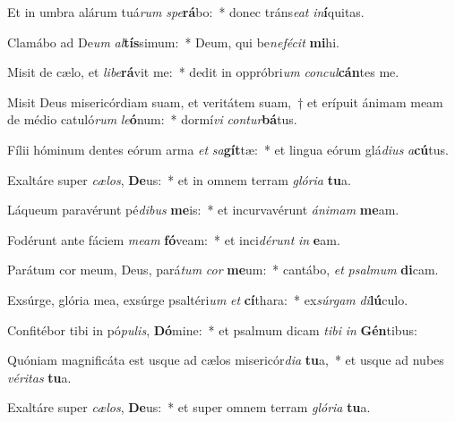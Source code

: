 \item Et in umbra alárum tuá\textit{rum} \textit{spe}\textbf{rá}bo:~* donec tráns\textit{e}\textit{at} \textit{in}\textbf{í}quitas.
\item Clamábo ad De\textit{um} \textit{al}\textbf{tís}simum:~* Deum, qui be\textit{ne}\textit{fé}\textit{cit} \textbf{mi}hi.
\item Misit de cælo, et \textit{li}\textit{be}\textbf{rá}vit me:~* dedit in oppróbri\textit{um} \textit{con}\textit{cul}\textbf{cán}tes me.
\item Misit Deus misericórdiam suam, et veritátem suam,~† et erípuit ánimam meam de médio catuló\textit{rum} \textit{le}\textbf{ó}num:~* dormí\textit{vi} \textit{con}\textit{tur}\textbf{bá}tus.
\item Fílii hóminum dentes eórum arma \textit{et} \textit{sa}\textbf{gít}tæ:~* et lingua eórum glá\textit{di}\textit{us} \textit{a}\textbf{cú}tus.
\item Exaltáre super \textit{cæ}\textit{los}, \textbf{De}us:~* et in omnem terram \textit{gló}\textit{ri}\textit{a} \textbf{tu}a.
\item Láqueum paravérunt pé\textit{di}\textit{bus} \textbf{me}is:~* et incurvavérunt \textit{á}\textit{ni}\textit{mam} \textbf{me}am.
\item Fodérunt ante fáciem \textit{me}\textit{am} \textbf{fó}veam:~* et inci\textit{dé}\textit{runt} \textit{in} \textbf{e}am.
\item Parátum cor meum, Deus, pará\textit{tum} \textit{cor} \textbf{me}um:~* cantábo, \textit{et} \textit{psal}\textit{mum} \textbf{di}cam.
\item Exsúrge, glória mea, exsúrge psaltéri\textit{um} \textit{et} \textbf{cí}thara:~* ex\textit{súr}\textit{gam} \textit{di}\textbf{lú}culo.
\item Confitébor tibi in pó\textit{pu}\textit{lis}, \textbf{Dó}mine:~* et psalmum dicam \textit{ti}\textit{bi} \textit{in} \textbf{Gén}tibus:
\item Quóniam magnificáta est usque ad cælos misericór\textit{di}\textit{a} \textbf{tu}a,~* et usque ad nubes \textit{vé}\textit{ri}\textit{tas} \textbf{tu}a.
\item Exaltáre super \textit{cæ}\textit{los}, \textbf{De}us:~* et super omnem terram \textit{gló}\textit{ri}\textit{a} \textbf{tu}a.
